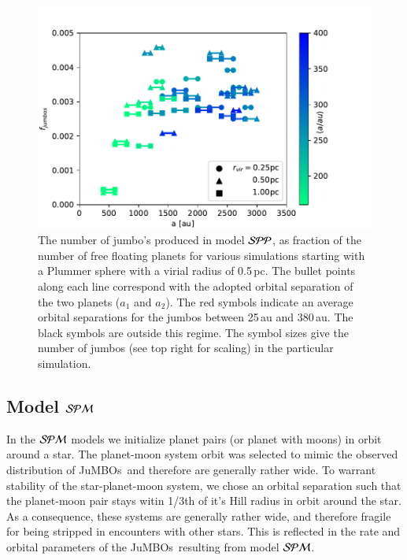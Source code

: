 \documentclass[aa]{lib/aa}
\newcommand{\jumbos}{\mbox{JuMBOs}}
\begin{document}
\begin{figure}
    \centering
        \includegraphics[width=.91\columnwidth]{figures/fig_fjumbos_from_psystems.pdf}
        \caption{The number of jumbo's produced in model ${\cal SPP}$,
          as fraction of the number of free floating planets for
          various simulations starting with a Plummer sphere with a
          virial radius of 0.5\,pc.  The bullet points along each line
          correspond with the adopted orbital separation of the two
          planets ($a_1$ and $a_2$).  The red symbols indicate an
          average orbital separations for the jumbos between 25\,au
          and 380\,au.  The black symbols are outside this regime.
          The symbol sizes give the number of jumbos (see top right
          for scaling) in the particular simulation.  }
         \label{Fig:fjumbos_from_PP}
\end{figure}

\subsection{Model ${\cal SPM}$}

In the ${\cal SPM}$ models we initialize planet pairs (or planet with
moons) in orbit around a star. The planet-moon system orbit was
selected to mimic the observed distribution of \jumbos\, and therefore
are generally rather wide. To warrant stability of the
star-planet-moon system, we chose an orbital separation such that the
planet-moon pair stays witin 1/3th of it's Hill radius in orbit around
the star. As a consequence, these systems are generally rather wide,
and therefore fragile for being stripped in encounters with other
stars.  This is reflected in the rate and orbital parameters of the
\jumbos\, resulting from model ${\cal SPM}$.
\end{document}
